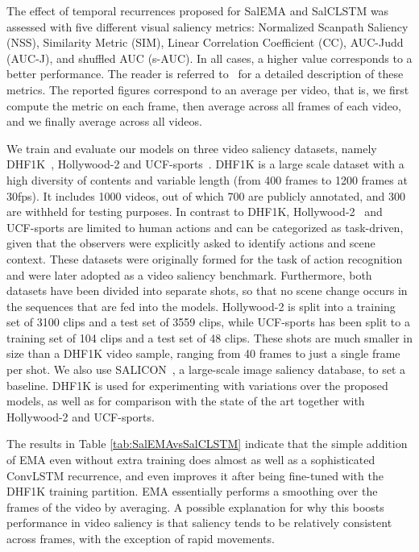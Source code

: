 \documentclass{bmvc2k}
\begin{document}
The effect of temporal recurrences proposed for SalEMA and SalCLSTM was assessed with five different visual saliency metrics: Normalized Scanpath Saliency (NSS), Similarity Metric (SIM), Linear Correlation Coefficient (CC), AUC-Judd (AUC-J), and shuffled AUC (s-AUC). In all cases, a higher value corresponds to a better performance. The reader is referred to~\cite{bylinskii2019different} for a detailed description of these metrics. The reported figures correspond to an average per video, that is, we first compute the metric on each frame, then average across all frames of each video, and we finally average across all videos.

We train and evaluate our models on three video saliency datasets, namely DHF1K~\cite{Wang2018a}, Hollywood-2 and UCF-sports~\cite{Hollywood_UCF}. DHF1K is a large scale dataset with a high diversity of contents and variable length (from 400 frames to 1200 frames at 30fps). It includes 1000 videos, out of which 700 are publicly annotated, and 300 are withheld for testing purposes. In contrast to DHF1K, Hollywood-2~\cite{Hollywood-Origins} and UCF-sports \cite{soomro2014action} are limited to human actions and can be categorized as task-driven, given that the observers were explicitly asked to identify actions and scene context. These datasets were originally formed for the task of action recognition and were later adopted as a video saliency benchmark. Furthermore, both datasets have been divided into separate shots, so that no scene change occurs in the sequences that are fed into the models. Hollywood-2 is split into a training set of 3100 clips and a test set of 3559 clips, while UCF-sports has been split to a training set of 104 clips and a test set of 48 clips. These shots are much smaller in size than a DHF1K video sample, ranging from 40 frames to just a single frame per shot. We also use SALICON~\cite{SALICON}, a large-scale image saliency database, to set a baseline.
DHF1K is used for experimenting with variations over the proposed models, as well as for comparison with the state of the art together with Hollywood-2 and UCF-sports.




The results in Table \ref{tab:SalEMAvsSalCLSTM} indicate that the simple addition of EMA even without extra training does almost as well as a sophisticated ConvLSTM recurrence, and even improves it after being fine-tuned with the DHF1K training partition. EMA essentially performs a smoothing over the frames of the video by averaging. A possible explanation for why this boosts performance in video saliency is that saliency tends to be relatively consistent across frames, with the exception of rapid movements. 
\end{document}

